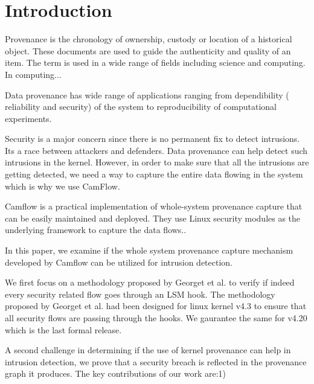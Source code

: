 \section{Introduction}
\label{What is provenance im general and with respect to computing?}

Provenance is the chronology of ownership, custody or location of a historical object. These documents are used to guide the authenticity and quality of an item. The term is used in a wide range of fields including science and computing. In computing...
\vskip 0.1in
\label{Applications of data provenance}

Data provenance has wide range of applications ranging from dependibility ( reliability and security) of the system to reproducibility of computational experiments.
\vskip 0.1in
\label{Role of data povenance in security}

Security is a major concern since there is no permanent fix to detect intrusions. Its a race between attackers and defenders. Data provenance can help detect such intrusions in the kernel. However, in order to make sure that all the intrusions are getting detected, we need a way to capture the entire data flowing in the system which is why we use CamFlow. 
\vskip 0.1in
\label{Camflow and whole system provenance and LSMs}

Camflow is a practical implementation of whole-system provenance capture that can be easily maintained and deployed. They use Linux security modules as the underlying framework to capture the data flows.. 


\label{What are we doing?}
In this paper, we examine if the whole system provenance capture mechanism developed by Camflow can be utilized for intrusion detection. 
\vskip 0.1in
\label{Challenge 1}

We first focus on a methodology proposed by Georget et al. to verify if indeed every security related flow goes through an LSM hook. The methodology proposed by Georget et al. had been designed for linux kernel v4.3 to ensure that all security flows are passing through the hooks. We gaurantee the same for v4.20 which is the last formal release. 
\vskip 0.1in
\label{Challenge 2}

A second challenge in determining if the use of kernel provenance can help in intrusion detection, we prove that a security breach is reflected in the provenance graph it produces. 
\vskip 0.1in
\label{Key contributions}
The key contributions of our work are:1)
